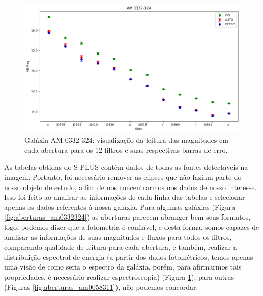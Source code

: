 \begin{figure}
  \centering 
  \includegraphics[width=1.0\textwidth]{Imagens/am0332324barraerro.png} 
  \caption[AM 0332-324: magnitudes em cada abertura para os 12 filtros.]{Galáxia AM 0332-324: visualização da leitura das magnitudes em cada abertura para os 12 filtros e suas respectivas barras de erro.}
  \label{fig:am0332324barraerro} 
\end{figure}

As tabelas obtidas do S-PLUS contêm dados de todas as fontes detectáveis na imagem. Portanto, foi necessário remover as elipses que não faziam parte do nosso objeto de estudo, a fim de nos concentrarmos nos dados de nosso interesse. Isso foi feito ao analisar as informações de cada linha das tabelas e selecionar apenas os dados referentes à nossa galáxia. Para algumas galáxias (Figura \ref{fig:aberturas_am0332324}) as aberturas parecem abranger bem seus formatos, logo, podemos dizer que a fotometria é confiável, e desta forma, somos capazes de analisar as informações de suas magnitudes e fluxos para todos os filtros, comparando qualidade de leitura para cada abertura, e também, realizar a distribuição espectral de energia (a partir dos dados fotométricos, temos apenas uma visão de como seria o espectro da galáxia, porém, para afirmarmos tais propriedades, é necessário realizar espectroscopia) (Figura \ref{fig:am0332324barraerro}); para outras (Figuras \ref{fig:aberturas_am0058311}), não podemos concordar.

